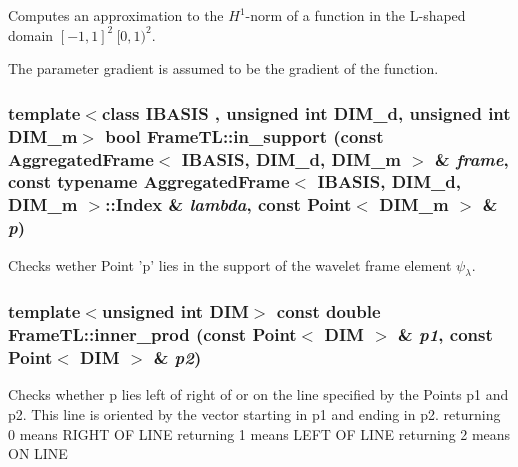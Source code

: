 Computes an approximation to the $H^1$-norm of a function in the L-shaped domain $[-1,1]^2 \ [0,1)^2$. 

The parameter gradient is assumed to be the gradient of the function. \hypertarget{namespaceFrameTL_0699f5e7931ab40bf346b17e6c3bde01}{
\subsubsection[{in\_\-support}]{\setlength{\rightskip}{0pt plus 5cm}template$<$class IBASIS , unsigned int DIM\_\-d, unsigned int DIM\_\-m$>$ bool FrameTL::in\_\-support (const AggregatedFrame$<$ IBASIS, DIM\_\-d, DIM\_\-m $>$ \& {\em frame}, \/  const typename AggregatedFrame$<$ IBASIS, DIM\_\-d, DIM\_\-m $>$::Index \& {\em lambda}, \/  const Point$<$ DIM\_\-m $>$ \& {\em p})}}
\label{namespaceFrameTL_0699f5e7931ab40bf346b17e6c3bde01}


Checks wether Point 'p' lies in the support of the wavelet frame element $\psi_\lambda$. \hypertarget{namespaceFrameTL_b442ddca04900a00608a3963348b15bb}{
\subsubsection[{inner\_\-prod}]{\setlength{\rightskip}{0pt plus 5cm}template$<$unsigned int DIM$>$ const double FrameTL::inner\_\-prod (const Point$<$ DIM $>$ \& {\em p1}, \/  const Point$<$ DIM $>$ \& {\em p2})}}
\label{namespaceFrameTL_b442ddca04900a00608a3963348b15bb}


Checks whether p lies left of right of or on the line specified by the Points p1 and p2. This line is oriented by the vector starting in p1 and ending in p2. returning 0 means RIGHT OF LINE returning 1 means LEFT OF LINE returning 2 means ON LINE

